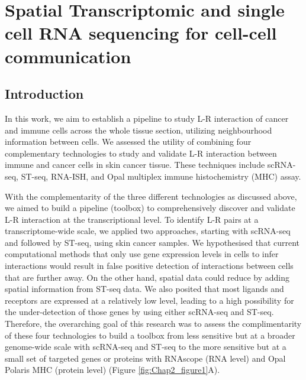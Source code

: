 \cleartoevenpage
\pagestyle{empty}	

\chapter[Spatial transcriptomic and single cell RNA sequencing for cell-cell communication]{Spatial Transcriptomic and single cell RNA sequencing for cell-cell communication}
\label{Chap:2}	%
\pagestyle{headings}
\section{Introduction}
\label{Sec:2.1_intro}	%

In this work, we aim to establish a pipeline to study L-R interaction of cancer and immune cells across the whole tissue section, utilizing neighbourhood information between cells. We assessed the utility of combining four complementary technologies to study and validate L-R interaction between immune and cancer cells in skin cancer tissue. These techniques include scRNA-seq, ST-seq, RNA-ISH, and Opal multiplex immune histochemistry (MHC) assay. 

With the complementarity of the three different technologies as discussed above, we aimed to build a pipeline (toolbox) to comprehensively discover and validate L-R interaction at the transcriptional level. To identify L-R pairs at a transcriptome-wide scale, we applied two approaches, starting with scRNA-seq and followed by ST-seq, using skin cancer samples. We hypothesised that current computational methods that only use gene expression levels in cells to infer interactions would result in false positive detection of interactions between cells that are further away. On the other hand, spatial data could reduce by adding spatial information from ST-seq data. We also posited that most ligands and receptors are expressed at a relatively low level, leading to a high possibility for the under-detection of those genes by using either scRNA-seq and ST-seq. Therefore, the overarching goal of this research was to assess the complimentarity of these four technologies to build a toolbox from less sensitive but at a broader genome-wide scale with scRNA-seq and ST-seq to the more sensitive but at a small set of targeted genes or proteins with RNAscope (RNA level) and Opal Polaris MHC (protein level) (Figure \ref{fig:Chap2_figure1}A). 

